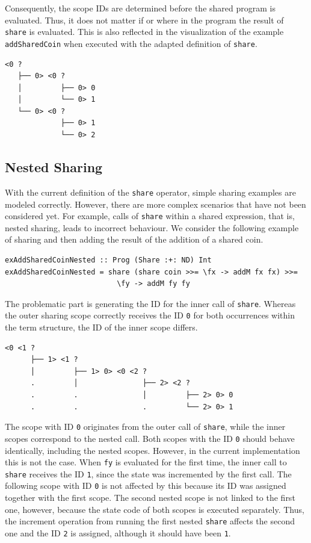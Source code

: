 \documentclass[a4paper, 11pt, fleqn, twoside, abstract=on]{scrreprt}
\newcommand{\hinl}[1]{\texttt{#1}}
\begin{document}
Consequently, the scope IDs are determined before the shared program is evaluated.
Thus, it does not matter if or where in the program the result of \hinl{share} is evaluated.
This is also reflected in the visualization of the example \hinl{addSharedCoin} when executed with the adapted definition of \hinl{share}.

\begin{verbatim}
<0 ? 
   ├── 0> <0 ? 
   │         ├── 0> 0
   │         └── 0> 1
   └── 0> <0 ? 
             ├── 0> 1
             └── 0> 2
\end{verbatim}

\subsection{Nested Sharing}
With the current definition of the \hinl{share} operator, simple sharing examples are modeled correctly.
However, there are more complex scenarios that have not been considered yet.
For example, calls of \hinl{share} within a shared expression, that is, nested sharing, leads to incorrect behaviour.
We consider the following example of sharing and then adding the result of the addition of a shared coin.

\begin{verbatim}
exAddSharedCoinNested :: Prog (Share :+: ND) Int
exAddSharedCoinNested = share (share coin >>= \fx -> addM fx fx) >>= 
                          \fy -> addM fy fy
\end{verbatim}

The problematic part is generating the ID for the inner call of \hinl{share}.
Whereas the outer sharing scope correctly receives the ID \hinl{0} for both occurrences within the term structure, the ID of the inner scope differs.

\begin{verbatim}
<0 <1 ? 
      ├── 1> <1 ? 
      │         ├── 1> 0> <0 <2 ? 
      .         │               ├── 2> <2 ? 
      .         .               │         ├── 2> 0> 0
      .         .               .         └── 2> 0> 1
\end{verbatim}

The scope with ID \hinl{0} originates from the outer call of \hinl{share}, while the inner scopes correspond to the nested call.
Both scopes with the ID \hinl{0} should behave identically, including the nested scopes.
However, in the current implementation this is not the case.
When \hinl{fy} is evaluated for the first time, the inner call to \hinl{share} receives the ID \hinl{1}, since the state was incremented by the first call.
The following scope with ID \hinl{0} is not affected by this because its ID was assigned together with the first scope.
The second nested scope is not linked to the first one, however, because the state code of both scopes is executed separately.
Thus, the increment operation from running the first nested \hinl{share} affects the second one and the ID \hinl{2} is assigned, although it should have been \hinl{1}.
\end{document}
